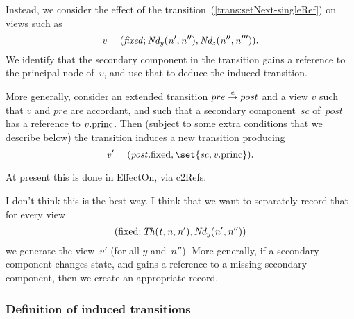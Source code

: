 Instead, we consider the effect of the 
transition~(\ref{trans:setNext-singleRef}) on views such as
\[\mit
v = (fixed; Nd_y(n', n''), Nd_z(n'', n''')).
\]
We identify that the secondary component in the  transition gains a
reference to the principal node of~$v$, and use that to deduce the induced
transition. 

More generally, consider an extended transition $pre \trans{e} post$ and a
view $v$ such that $v$ and $pre$ are accordant, and such that a secondary
component~$sc$ of~$post$ has a reference to $v.\princ$.  Then (subject to some
extra conditions that we describe below) the transition induces a new
transition producing
\[\mit
v' = (post.\fixed, \set{sc, v.\princ}).
\]

\begin{impNote}
At present this is done in EffectOn, via c2Refs. 
\end{impNote}

\begin{improve}
I don't think this is the
best way.  I think that we want to separately record that for every view
\[\mit 
(\fixed; Th(t, n, n'), Nd_y(n', n''))
\]
we generate the view~$v'$ (for all $y$ and~$n''$).  More generally, if a
secondary component changes state, and gains a reference to a missing
secondary component, then we create an appropriate record.
\end{improve}



\subsubsection{Definition of induced transitions}

